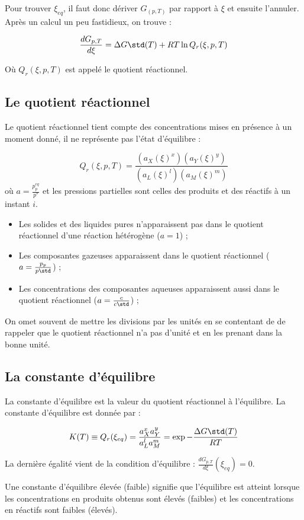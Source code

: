 Pour trouver $\xi_{eq}$, il faut donc dériver $G_(p, T)$ par rapport
à $\xi$ et ensuite l'annuler. Après un calcul un peu fastidieux, on trouve :

$$\frac{dG_{p, T}}{d\xi} = \Delta G\std(T) + RT \ln Q_r(\xi, p, T)$$

Où $Q_r(\xi, p, T)$ est appelé le quotient réactionnel.

\subsection{Le quotient réactionnel}
Le quotient réactionnel tient compte des concentrations mises en présence
à un moment donné, il ne représente pas l'état d'équilibre :

$$Q_r(\xi, p, T) = \frac{(a_X(\xi)^x)(a_Y(\xi)^y)}{(a_L(\xi)^l)(a_M(\xi)^m)} $$
où $a = \frac{p_p^{eq}}{p°}$ et les pressions partielles sont celles des produits
et des réactifs à un instant $i$.

\begin{itemize}
  \item
    Les solides et des liquides pures n'apparaissent pas
    dans le quotient réactionnel d'une réaction hétérogène ($a = 1$) ;
  \item
    Les composantes gazeuses apparaissent dans le quotient
    réactionnel ($a = \frac{p_p}{p\std}$) ;
  \item
    Les concentrations des composantes aqueuses apparaissent aussi
    dans le quotient réactionnel ($a = \frac{c}{c\std}$) ;
\end{itemize}

On omet souvent de mettre les divisions par les unités en se contentant de
de rappeler que le quotient réactionnel n'a pas d'unité et en les prenant
dans la bonne unité.

\subsection{La constante d'équilibre}
La constante d'équilibre est la valeur du quotient réactionnel à l'équilibre.
La constante d'équilibre est donnée par : 

$$K(T) \equiv Q_r(\xi_{eq}) = \frac{a^x_X a^y_Y}{a^l_L a^m_M} = \exp 
-\frac{\Delta G\std(T)}{RT}$$

La dernière égalité vient de la condition d'équilibre : 
$\frac{dG_{p, T}}{d\xi}(\xi_{eq}) = 0$.

Une constante d'équilibre élevée (faible) signifie que l'équilibre est atteint
lorsque les concentrations en produits obtenus sont élevés (faibles)
et les concentrations en réactifs sont faibles (élevés).

